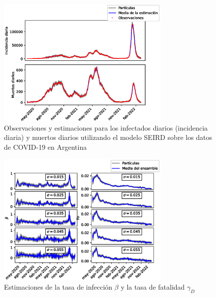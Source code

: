 \begin{figure}[h]
    \centering
    \includegraphics[width=0.75\textwidth]{figs/seird_online_em_aug_state_state_vars_arg_data.eps}
    \caption{Observaciones y estimaciones para los infectados diarios (incidencia diaria) y muertos diarios utilizando el modelo SEIRD sobre los datos de COVID-19 en Argentina}
    \label{fig:seird_vars_arg_data}
\end{figure}
\begin{figure}[h]
    \centering
    \includegraphics[width=0.75\textwidth]{figs/seird_online_em_aug_state_params_arg_data_sigmas.eps}
    \caption{Estimaciones de la tasa de infección $\beta$ y la tasa de fatalidad $\gamma_D$}
    \label{fig:seird_params_arg_data}
\end{figure}

